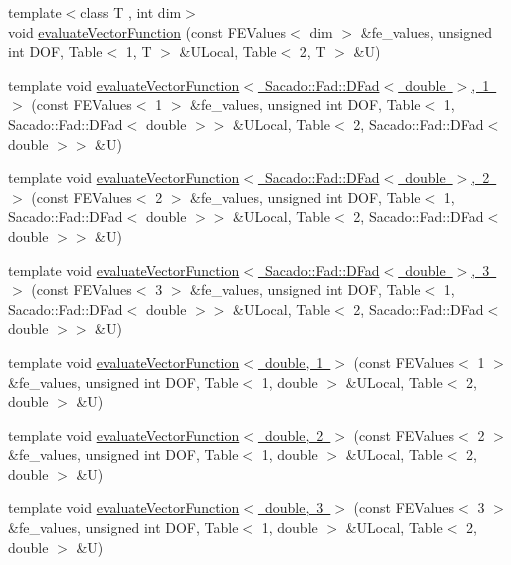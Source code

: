 \begin{DoxyCompactItemize}
\item 
{\footnotesize template$<$class T , int dim$>$ }\\void \mbox{\hyperlink{group___evaluation_functions_gab9e164be1be244df81c932426a4bd513}{evaluate\+Vector\+Function}} (const F\+E\+Values$<$ dim $>$ \&fe\+\_\+values, unsigned int D\+OF, Table$<$ 1, T $>$ \&U\+Local, Table$<$ 2, T $>$ \&U)
\item 
template void \mbox{\hyperlink{function_evaluations_8cc_a668c45fc65b525a83192a67dd35571c6}{evaluate\+Vector\+Function$<$ Sacado\+::\+Fad\+::\+D\+Fad$<$ double $>$, 1 $>$}} (const F\+E\+Values$<$ 1 $>$ \&fe\+\_\+values, unsigned int D\+OF, Table$<$ 1, Sacado\+::\+Fad\+::\+D\+Fad$<$ double $>$$>$ \&U\+Local, Table$<$ 2, Sacado\+::\+Fad\+::\+D\+Fad$<$ double $>$$>$ \&U)
\item 
template void \mbox{\hyperlink{function_evaluations_8cc_a28ceac224510d9b9753dbe934874d56b}{evaluate\+Vector\+Function$<$ Sacado\+::\+Fad\+::\+D\+Fad$<$ double $>$, 2 $>$}} (const F\+E\+Values$<$ 2 $>$ \&fe\+\_\+values, unsigned int D\+OF, Table$<$ 1, Sacado\+::\+Fad\+::\+D\+Fad$<$ double $>$$>$ \&U\+Local, Table$<$ 2, Sacado\+::\+Fad\+::\+D\+Fad$<$ double $>$$>$ \&U)
\item 
template void \mbox{\hyperlink{function_evaluations_8cc_a49bf826d13c295bef33c6d320e96a6ee}{evaluate\+Vector\+Function$<$ Sacado\+::\+Fad\+::\+D\+Fad$<$ double $>$, 3 $>$}} (const F\+E\+Values$<$ 3 $>$ \&fe\+\_\+values, unsigned int D\+OF, Table$<$ 1, Sacado\+::\+Fad\+::\+D\+Fad$<$ double $>$$>$ \&U\+Local, Table$<$ 2, Sacado\+::\+Fad\+::\+D\+Fad$<$ double $>$$>$ \&U)
\item 
template void \mbox{\hyperlink{function_evaluations_8cc_adab42860d3e6d233bc937b4574606f60}{evaluate\+Vector\+Function$<$ double, 1 $>$}} (const F\+E\+Values$<$ 1 $>$ \&fe\+\_\+values, unsigned int D\+OF, Table$<$ 1, double $>$ \&U\+Local, Table$<$ 2, double $>$ \&U)
\item 
template void \mbox{\hyperlink{function_evaluations_8cc_a418401c6810307bd7073ff5f72b3bd77}{evaluate\+Vector\+Function$<$ double, 2 $>$}} (const F\+E\+Values$<$ 2 $>$ \&fe\+\_\+values, unsigned int D\+OF, Table$<$ 1, double $>$ \&U\+Local, Table$<$ 2, double $>$ \&U)
\item 
template void \mbox{\hyperlink{function_evaluations_8cc_af05742550c00c35879af970241b9f6fc}{evaluate\+Vector\+Function$<$ double, 3 $>$}} (const F\+E\+Values$<$ 3 $>$ \&fe\+\_\+values, unsigned int D\+OF, Table$<$ 1, double $>$ \&U\+Local, Table$<$ 2, double $>$ \&U)
\item 

\end{DoxyCompactItemize}

